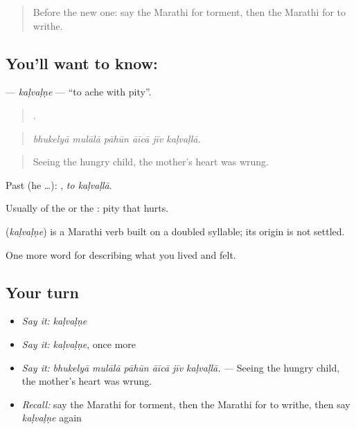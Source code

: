 \label{lesson:MR-C467-kalvalne}



\begin{quote}
Before the new one: say the Marathi for torment, then the Marathi for to writhe.
\end{quote}

\subsection*{You'll want to know: }
\textbf{} — \emph{kaḷvaḷṇe} — \textquotedblleft{}to ache with pity\textquotedblright{}.

\begin{quote}
     .
\end{quote}

\begin{quote}
\emph{bhukelyā mulālā pāhūn āīcā jīv kaḷvaḷlā.}
\end{quote}

\begin{quote}
Seeing the hungry child, the mother's heart was wrung.
\end{quote}

Past (he …):  , \emph{to kaḷvaḷlā}.

Usually of the  or the : pity that hurts.

\begin{cousinweb}
\textbf{} (\emph{kaḷvaḷṇe}) is a Marathi verb built on a doubled syllable; its origin is not settled.
\end{cousinweb}

\begin{grammarlens}[title={What you've built}]
One more word for describing what you lived and felt.
\end{grammarlens}

\subsection*{Your turn}
\begin{itemize}
\raggedright
  \item \emph{Say it:} \emph{kaḷvaḷṇe}
  \item \emph{Say it:} \emph{kaḷvaḷṇe}, once more
  \item \emph{Say it:} \emph{bhukelyā mulālā pāhūn āīcā jīv kaḷvaḷlā.} — Seeing the hungry child, the mother's heart was wrung.
  \item \emph{Recall:} say the Marathi for torment, then the Marathi for to writhe, then say \emph{kaḷvaḷṇe} again
\end{itemize}

